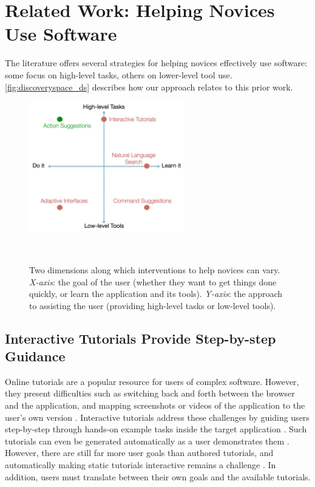 \section{Related Work: Helping Novices Use Software}
The literature offers several strategies for helping novices effectively use software: some focus on high-level tasks, others on lower-level tool use. \autoref{fig:discoveryspace_ds} describes how our approach relates to this prior work. 

\begin{figure}
\centering
  \includegraphics[width=0.6\textwidth]{discoveryspace/figures/designspace.png}
  \caption{Two dimensions along which interventions to help novices can vary. \textit{X-axis}: the goal of the user (whether they want to get things done quickly, or learn the application and its tools). \textit{Y-axis}: the approach to assisting the user (providing high-level tasks or low-level tools).}~\label{fig:discoveryspace_ds}
\end{figure}

\subsection{Interactive Tutorials Provide Step-by-step Guidance}
Online tutorials are a popular resource for users of complex software. However, they present difficulties such as switching back and forth between the browser and the application, and mapping screenshots or videos of the application to the user's own version \cite{Kelleher2005, Pongnumkul2011}. Interactive tutorials address these challenges by guiding users step-by-step through hands-on example tasks inside the target application \cite{Kelleher2005, Lafreniere2014a, Pongnumkul2011}. Such tutorials can even be generated automatically as a user demonstrates them \cite{Grabler2009}. However, there are still far more user goals than authored tutorials, and automatically making static tutorials interactive remains a challenge \cite{Fourney2014Mining, Laput2012}. In addition, users must translate between their own goals and the available tutorials.

